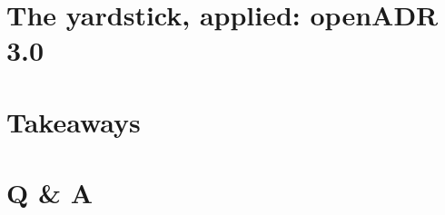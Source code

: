 \documentclass[aspectratio=169]{beamer}
\begin{document}
\section{The yardstick, applied: openADR 3.0}

% 

% 


\section{Takeaways}




\section{Q \& A}

\end{document}
